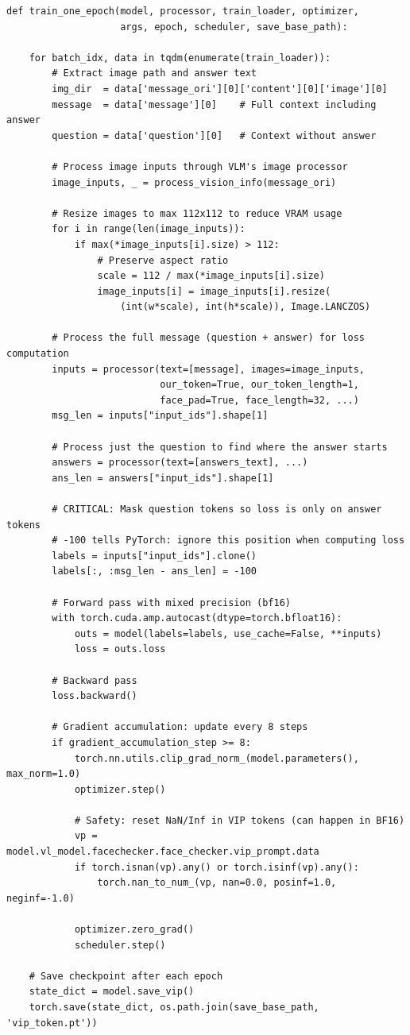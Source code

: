 \documentclass[12pt,a4paper]{article}
\begin{document}
\begin{lstlisting}[caption={Stage3\_train.py -- train\_one\_epoch (key parts)}]
def train_one_epoch(model, processor, train_loader, optimizer,
                    args, epoch, scheduler, save_base_path):

    for batch_idx, data in tqdm(enumerate(train_loader)):
        # Extract image path and answer text
        img_dir  = data['message_ori'][0]['content'][0]['image'][0]
        message  = data['message'][0]    # Full context including answer
        question = data['question'][0]   # Context without answer

        # Process image inputs through VLM's image processor
        image_inputs, _ = process_vision_info(message_ori)

        # Resize images to max 112x112 to reduce VRAM usage
        for i in range(len(image_inputs)):
            if max(*image_inputs[i].size) > 112:
                # Preserve aspect ratio
                scale = 112 / max(*image_inputs[i].size)
                image_inputs[i] = image_inputs[i].resize(
                    (int(w*scale), int(h*scale)), Image.LANCZOS)

        # Process the full message (question + answer) for loss computation
        inputs = processor(text=[message], images=image_inputs,
                           our_token=True, our_token_length=1,
                           face_pad=True, face_length=32, ...)
        msg_len = inputs["input_ids"].shape[1]

        # Process just the question to find where the answer starts
        answers = processor(text=[answers_text], ...)
        ans_len = answers["input_ids"].shape[1]

        # CRITICAL: Mask question tokens so loss is only on answer tokens
        # -100 tells PyTorch: ignore this position when computing loss
        labels = inputs["input_ids"].clone()
        labels[:, :msg_len - ans_len] = -100

        # Forward pass with mixed precision (bf16)
        with torch.cuda.amp.autocast(dtype=torch.bfloat16):
            outs = model(labels=labels, use_cache=False, **inputs)
            loss = outs.loss

        # Backward pass
        loss.backward()

        # Gradient accumulation: update every 8 steps
        if gradient_accumulation_step >= 8:
            torch.nn.utils.clip_grad_norm_(model.parameters(), max_norm=1.0)
            optimizer.step()

            # Safety: reset NaN/Inf in VIP tokens (can happen in BF16)
            vp = model.vl_model.facechecker.face_checker.vip_prompt.data
            if torch.isnan(vp).any() or torch.isinf(vp).any():
                torch.nan_to_num_(vp, nan=0.0, posinf=1.0, neginf=-1.0)

            optimizer.zero_grad()
            scheduler.step()

    # Save checkpoint after each epoch
    state_dict = model.save_vip()
    torch.save(state_dict, os.path.join(save_base_path, 'vip_token.pt'))
\end{lstlisting}
\end{document}

